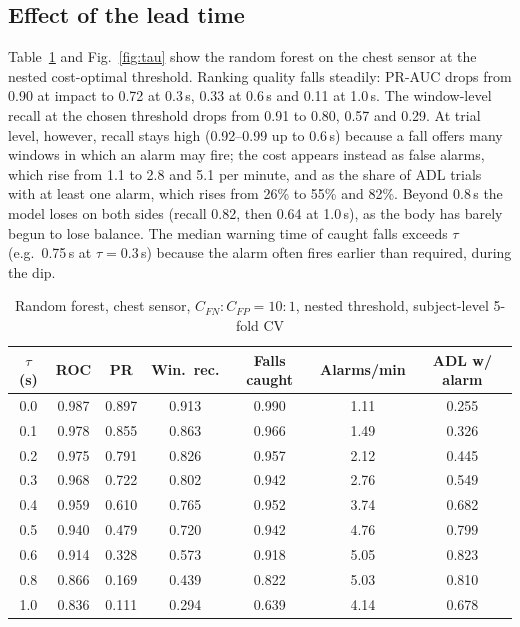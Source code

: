 \documentclass[conference]{IEEEtran}
\begin{document}
\subsection{Effect of the lead time}
Table~\ref{tab:main} and Fig.~\ref{fig:tau} show the random forest on the chest sensor at the nested cost-optimal threshold. Ranking quality falls steadily: PR-AUC drops from 0.90 at impact to 0.72 at 0.3\,s, 0.33 at 0.6\,s and 0.11 at 1.0\,s. The window-level recall at the chosen threshold drops from 0.91 to 0.80, 0.57 and 0.29. At trial level, however, recall stays high (0.92--0.99 up to 0.6\,s) because a fall offers many windows in which an alarm may fire; the cost appears instead as false alarms, which rise from 1.1 to 2.8 and 5.1 per minute, and as the share of ADL trials with at least one alarm, which rises from 26\% to 55\% and 82\%. Beyond 0.8\,s the model loses on both sides (recall 0.82, then 0.64 at 1.0\,s), as the body has barely begun to lose balance. The median warning time of caught falls exceeds $\tau$ (e.g.\ 0.75\,s at $\tau=0.3$\,s) because the alarm often fires earlier than required, during the dip.

\begin{table}[t]
\caption{Random forest, chest sensor, $C_{FN}{:}C_{FP}=10{:}1$, nested threshold, subject-level 5-fold CV}
\label{tab:main}
\centering
\footnotesize
\setlength{\tabcolsep}{3.2pt}
\begin{tabular}{@{}ccccccc@{}}
\toprule
$\tau$ (s) & ROC & PR & Win.\ rec. & Falls caught & Alarms/min & ADL w/ alarm \\
\midrule
0.0 & 0.987 & 0.897 & 0.913 & 0.990 & 1.11 & 0.255 \\
0.1 & 0.978 & 0.855 & 0.863 & 0.966 & 1.49 & 0.326 \\
0.2 & 0.975 & 0.791 & 0.826 & 0.957 & 2.12 & 0.445 \\
0.3 & 0.968 & 0.722 & 0.802 & 0.942 & 2.76 & 0.549 \\
0.4 & 0.959 & 0.610 & 0.765 & 0.952 & 3.74 & 0.682 \\
0.5 & 0.940 & 0.479 & 0.720 & 0.942 & 4.76 & 0.799 \\
0.6 & 0.914 & 0.328 & 0.573 & 0.918 & 5.05 & 0.823 \\
0.8 & 0.866 & 0.169 & 0.439 & 0.822 & 5.03 & 0.810 \\
1.0 & 0.836 & 0.111 & 0.294 & 0.639 & 4.14 & 0.678 \\
\bottomrule
\end{tabular}
\end{table}
\end{document}
